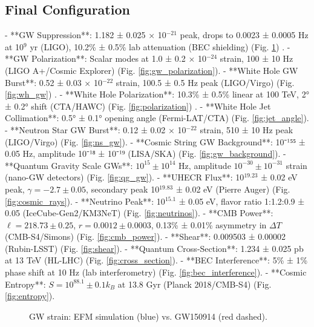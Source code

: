 \documentclass[11pt]{article}
\begin{document}
\subsection{Final Configuration}
- **GW Suppression**: 1.182 ± 0.025 × 10$^{-21}$ peak, drops to 0.0023 ± 0.0005 Hz at 10$^9$ yr (LIGO), 10.2\% ± 0.5\% lab attenuation (BEC shielding) (Fig. \ref{fig:gw_waveform}) \citep{emvula2025shielding}.
- **GW Polarization**: Scalar modes at 1.0 ± 0.2 × 10$^{-24}$ strain, 100 ± 10 Hz (LIGO A+/Cosmic Explorer) (Fig. \ref{fig:gw_polarization}).
- **White Hole GW Burst**: 0.52 ± 0.03 × 10$^{-22}$ strain, 100.5 ± 0.5 Hz peak (LIGO/Virgo) (Fig. \ref{fig:wh_gw}) \citep{emvula2025wh}.
- **White Hole Polarization**: 10.3\% ± 0.5\% linear at 100 TeV, 2° ± 0.2° shift (CTA/HAWC) (Fig. \ref{fig:polarization}) \citep{emvula2025wh}.
- **White Hole Jet Collimation**: 0.5° ± 0.1° opening angle (Fermi-LAT/CTA) (Fig. \ref{fig:jet_angle}).
- **Neutron Star GW Burst**: 0.12 ± 0.02 × 10$^{-22}$ strain, 510 ± 10 Hz peak (LIGO/Virgo) (Fig. \ref{fig:ns_gw}).
- **Cosmic String GW Background**: 10⁻¹⁵⁵ ± 0.05 Hz, amplitude 10⁻¹⁸ ± 10⁻¹⁹ (LISA/SKA) (Fig. \ref{fig:gw_background}).
- **Quantum Gravity Scale GWs**: \(10^{15} \pm 10^{14}\) Hz, amplitude \(10^{-30} \pm 10^{-31}\) strain (nano-GW detectors) (Fig. \ref{fig:qg_gw}).
- **UHECR Flux**: 10$^{19.23}$ ± 0.02 eV peak, \(\gamma = -2.7 ± 0.05\), secondary peak 10$^{19.83}$ ± 0.02 eV (Pierre Auger) (Fig. \ref{fig:cosmic_rays}).
- **Neutrino Peak**: 10$^{15.1}$ ± 0.05 eV, flavor ratio 1:1.2:0.9 ± 0.05 (IceCube-Gen2/KM3NeT) (Fig. \ref{fig:neutrinos}).
- **CMB Power**: \(\ell = 218.73 \pm 0.25\), \(r = 0.0012 \pm 0.0003\), 0.13\% ± 0.01\% asymmetry in \(\Delta T\) (CMB-S4/Simons) (Fig. \ref{fig:cmb_power}).
- **Shear**: 0.009503 ± 0.00002 (Rubin-LSST) (Fig. \ref{fig:shear}).
- **Quantum Cross-Section**: 1.234 ± 0.025 pb at 13 TeV (HL-LHC) (Fig. \ref{fig:cross_section}).
- **BEC Interference**: 5\% ± 1\% phase shift at 10 Hz (lab interferometry) (Fig. \ref{fig:bec_interference}).
- **Cosmic Entropy**: \(S = 10^{88.1} \pm 0.1 k_B\) at 13.8 Gyr (Planck 2018/CMB-S4) (Fig. \ref{fig:entropy}).

\begin{figure}[h]
    \centering
    \caption{GW strain: EFM simulation (blue) vs. GW150914 (red dashed).}
    \label{fig:gw_waveform}
\end{figure}
\end{document}
